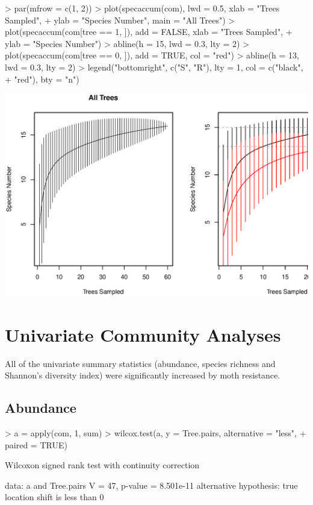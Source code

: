 \documentclass[a4paper]{article}
\begin{document}
\begin{Schunk}
\begin{Sinput}
> par(mfrow = c(1, 2))
> plot(specaccum(com), lwd = 0.5, xlab = "Trees Sampled", 
+     ylab = "Species Number", main = "All Trees")
> plot(specaccum(com[tree == 1, ]), add = FALSE, xlab = "Trees Sampled", 
+     ylab = "Species Number")
> abline(h = 15, lwd = 0.3, lty = 2)
> plot(specaccum(com[tree == 0, ]), add = TRUE, col = "red")
> abline(h = 13, lwd = 0.3, lty = 2)
> legend("bottomright", c("S", "R"), lty = 1, col = c("black", 
+     "red"), bty = "n")
\end{Sinput}
\end{Schunk}
\includegraphics{SCRL_tex-004}


\section{Univariate Community Analyses}

All of the univariate summary statistics (abundance, species richness and Shannon's diversity index) were significantly increased by moth resistance.

\subsection{Abundance}

\begin{Schunk}
\begin{Sinput}
> a = apply(com, 1, sum)
> wilcox.test(a, y = Tree.pairs, alternative = "less", 
+     paired = TRUE)
\end{Sinput}
\begin{Soutput}
	Wilcoxon signed rank test with continuity correction

data:  a and Tree.pairs 
V = 47, p-value = 8.501e-11
alternative hypothesis: true location shift is less than 0 
\end{Soutput}
\end{Schunk}
\end{document}
